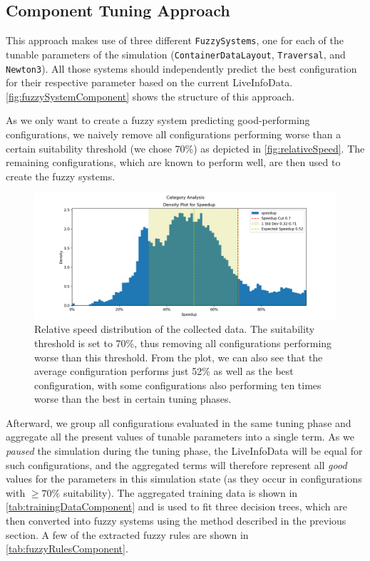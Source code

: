 \subsection{Component Tuning Approach}

This approach makes use of three different \texttt{FuzzySystems}, one for each of the tunable parameters of the simulation (\texttt{ContainerDataLayout}, \texttt{Traversal}, and \texttt{Newton3}). All those systems should independently predict the best configuration for their respective parameter based on the current LiveInfoData. \autoref{fig:fuzzySystemComponent} shows the structure of this approach.

As we only want to create a fuzzy system predicting good-performing configurations, we naively remove all configurations performing worse than a certain suitability threshold (we chose 70\%) as depicted in \autoref{fig:relativeSpeed}. The remaining configurations, which are known to perform well, are then used to create the fuzzy systems.


\begin{figure}[H]
    \centering
    \includegraphics[width=\columnwidth,trim={1cm 0 2cm 1.5cm},clip]{figures/DataAnalytics/speedup.png}
    \caption[Relative speed distribution of the collected data]{Relative speed distribution of the collected data. The suitability threshold is set to 70\%, thus removing all configurations performing worse than this threshold. From the plot, we can also see that the average configuration performs just 52\% as well as the best configuration, with some configurations also performing ten times worse than the best in certain tuning phases.}
    \label{fig:relativeSpeed}
\end{figure}

Afterward, we group all configurations evaluated in the same tuning phase and aggregate all the present values of tunable parameters into a single term. As we \emph{paused} the simulation during the tuning phase, the LiveInfoData will be equal for such configurations, and the aggregated terms will therefore represent all \emph{good} values for the parameters in this simulation state (as they occur in configurations with $\geq 70\%$ suitability). The aggregated training data is shown in \autoref{tab:trainingDataComponent} and is used to fit three decision trees, which are then converted into fuzzy systems using the method described in the previous section. A few of the extracted fuzzy rules are shown in \autoref{tab:fuzzyRulesComponent}.

